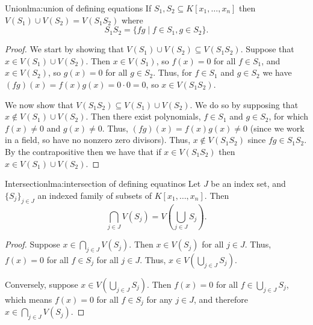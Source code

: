 \documentclass[fleqn]{NotesClass}
\begin{document}
    \begin{lma}{Union}{lma:union of defining equations}
        If \(S_1, S_2 \subseteq K[x_1, \dotsc, x_n]\) then \(V(S_1) \cup V(S_2) = V(S_1 S_2)\) where
        \begin{equation}
            S_1 S_2 = \{fg \mid f \in S_1, g \in S_2\}.
        \end{equation}
        \begin{proof}
            We start by showing that \(V(S_1) \cup V(S_2) \subseteq V(S_1 S_2)\).
            Suppose that \(x \in V(S_1) \cup V(S_2)\).
            Then \(x \in V(S_1)\), so \(f(x) = 0\) for all \(f \in S_1\), and \(x \in V(S_2)\), so \(g(x) = 0\) for all \(g \in S_2\).
            Thus, for \(f \in S_1\) and \(g \in S_2\) we have \((fg)(x) = f(x)g(x) = 0 \cdot 0 = 0\), so \(x \in V(S_1S_2)\).
            
            We now show that \(V(S_1S_2) \subseteq V(S_1) \cup V(S_2)\).
            We do so by supposing that \(x \notin V(S_1) \cup V(S_2)\).
            Then there exist polynomials, \(f \in S_1\) and \(g \in S_2\), for which \(f(x) \ne 0\) and \(g(x) \ne 0\).
            Thus, \((fg)(x) = f(x)g(x) \ne 0\) (since we work in a field, so have no nonzero zero divisors).
            Thus, \(x \notin V(S_1S_2)\) since \(fg \in S_1S_2\).
            By the contrapositive then we have that if \(x \in V(S_1S_2)\) then \(x \in V(S_1) \cup V(S_2)\).
        \end{proof}
    \end{lma}
    
    \begin{lma}{Intersection}{lma:intersection of defining equatinos}
        Let \(J\) be an index set, and \(\{S_j\}_{j \in J}\) an indexed family of subsets of \(K[x_1, \dotsc, x_n]\).
        Then
        \begin{equation}
            \bigcap_{j \in J} V(S_j) = V\left( \bigcup_{j \in J} S_j \right).
        \end{equation}
        \begin{proof}
            Suppose \(x \in \bigcap_{j \in J} V(S_j)\).
            Then \(x \in V(S_j)\) for all \(j \in J\).
            Thus, \(f(x) = 0\) for all \(f \in S_j\) for all \(j \in J\).
            Thus, \(x \in V\left( \bigcup_{j \in J} S_j \right)\).
            
            Conversely, suppose \(x \in V\left( \bigcup_{j \in J} S_j \right)\).
            Then \(f(x) = 0\) for all \(f \in \bigcup_{j \in J} S_j\), which means \(f(x) = 0\) for all \(f \in S_j\) for any \(j \in J\), and therefore \(x \in \bigcap_{j \in J} V(S_j)\).
        \end{proof}
    \end{lma}
    
\end{document}
